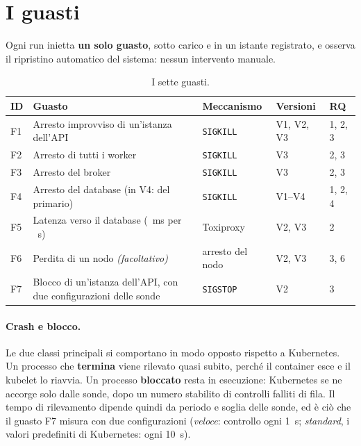 \section{I guasti}
\label{s:guasti}

Ogni run inietta \textbf{un solo guasto}, sotto carico e in un istante registrato, e osserva il ripristino automatico del sistema: nessun intervento manuale.

\begin{table}[H]
\centering
\caption{I sette guasti.}
\label{tab:guasti}
\begin{tabularx}{\linewidth}{@{}lLlll@{}}
\toprule
\textbf{ID} & \textbf{Guasto} & \textbf{Meccanismo} & \textbf{Versioni} & \textbf{RQ} \\
\midrule
F1 & Arresto improvviso di un'istanza dell'API & \texttt{SIGKILL} & V1, V2, V3 & 1, 2, 3 \\
F2 & Arresto di tutti i worker & \texttt{SIGKILL} & V3 & 2, 3 \\
F3 & Arresto del broker & \texttt{SIGKILL} & V3 & 2, 3 \\
F4 & Arresto del database (in V4: del primario) & \texttt{SIGKILL} & V1--V4 & 1, 2, 4 \\
F5 & Latenza verso il database (~ms per ~s) & Toxiproxy & V2, V3 & 2 \\
F6 & Perdita di un nodo \textit{(facoltativo)} & arresto del nodo & V2, V3 & 3, 6 \\
F7 & Blocco di un'istanza dell'API, con due configurazioni delle sonde & \texttt{SIGSTOP} & V2 & 3 \\
\bottomrule
\end{tabularx}
\end{table}

\paragraph{Crash e blocco.} Le due classi principali si comportano in modo opposto rispetto a Kubernetes. Un processo che \textbf{termina} viene rilevato quasi subito, perché il container esce e il kubelet lo riavvia. Un processo \textbf{bloccato} resta in esecuzione: Kubernetes se ne accorge solo dalle sonde, dopo un numero stabilito di controlli falliti di fila. Il tempo di rilevamento dipende quindi da periodo e soglia delle sonde, ed è ciò che il guasto F7 misura con due configurazioni (\emph{veloce}: controllo ogni 1~s; \emph{standard}, i valori predefiniti di Kubernetes: ogni 10~s).

